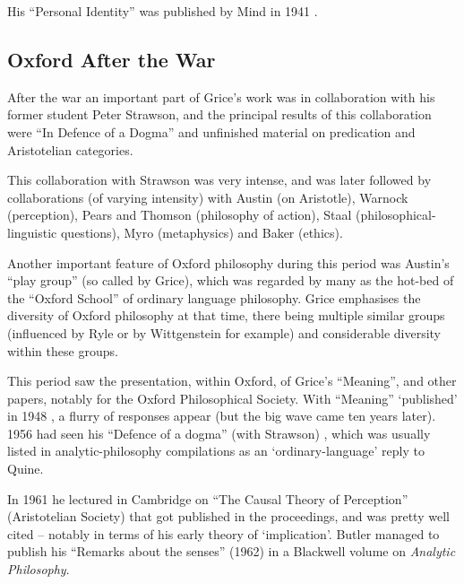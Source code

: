 \documentclass[10pt,titlepage]{book}
\begin{document}
His ``Personal Identity'' was published by Mind in 1941 \cite{grice41}. 

\subsection{Oxford After the War}

After the war an important part of Grice's work was in collaboration with his former student Peter Strawson, and the principal results of this collaboration were ``In Defence of a Dogma'' \cite{grice56} and unfinished material on predication and Aristotelian categories.

This collaboration with Strawson was very intense, and was later followed by collaborations (of varying intensity) with Austin (on Aristotle), Warnock (perception), Pears and Thomson (philosophy of action), Staal (philosophical-linguistic questions), Myro (metaphysics) and Baker (ethics).

Another important feature of Oxford philosophy during this period was Austin's ``play group'' (so called by Grice), which was regarded by many as the hot-bed of the ``Oxford School'' of ordinary language philosophy.
Grice emphasises the diversity of Oxford philosophy at that time, there being multiple similar groups (influenced by Ryle or by Wittgenstein for example) and considerable diversity within these groups.  

This period saw the presentation, within Oxford, of Grice's ``Meaning'', and other papers, notably for the Oxford Philosophical Society.
With ``Meaning'' `published' in 1948 \cite{Grice48}, a flurry of responses appear (but the big wave came ten years later).
1956 had seen his ``Defence of a dogma'' (with Strawson) \cite{grice56}, which was usually listed in analytic-philosophy compilations as an `ordinary-language' reply to Quine.

In 1961 he lectured in Cambridge on ``The Causal Theory of Perception'' (Aristotelian Society) that got published in the proceedings, and was pretty well cited -- notably in terms of his early theory of `implication'.
Butler managed to publish  his ``Remarks about the senses'' (1962) in a Blackwell volume on \emph{Analytic  Philosophy}.
\end{document}

